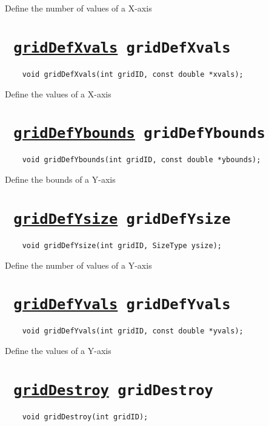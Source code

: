 Define the number of values of a X-axis
\ifpdfoutput{}{(\ref{gridDefXsize})}


\section*{\texttt{ 
\ifpdf
\hyperref[gridDefXvals]{gridDefXvals}
\else
gridDefXvals
\fi
}}
\begin{verbatim}
    void gridDefXvals(int gridID, const double *xvals);
\end{verbatim}

Define the values of a X-axis
\ifpdfoutput{}{(\ref{gridDefXvals})}


\section*{\texttt{ 
\ifpdf
\hyperref[gridDefYbounds]{gridDefYbounds}
\else
gridDefYbounds
\fi
}}
\begin{verbatim}
    void gridDefYbounds(int gridID, const double *ybounds);
\end{verbatim}

Define the bounds of a Y-axis
\ifpdfoutput{}{(\ref{gridDefYbounds})}


\section*{\texttt{ 
\ifpdf
\hyperref[gridDefYsize]{gridDefYsize}
\else
gridDefYsize
\fi
}}
\begin{verbatim}
    void gridDefYsize(int gridID, SizeType ysize);
\end{verbatim}

Define the number of values of a Y-axis
\ifpdfoutput{}{(\ref{gridDefYsize})}


\section*{\texttt{ 
\ifpdf
\hyperref[gridDefYvals]{gridDefYvals}
\else
gridDefYvals
\fi
}}
\begin{verbatim}
    void gridDefYvals(int gridID, const double *yvals);
\end{verbatim}

Define the values of a Y-axis
\ifpdfoutput{}{(\ref{gridDefYvals})}


\section*{\texttt{ 
\ifpdf
\hyperref[gridDestroy]{gridDestroy}
\else
gridDestroy
\fi
}}
\begin{verbatim}
    void gridDestroy(int gridID);
\end{verbatim}

